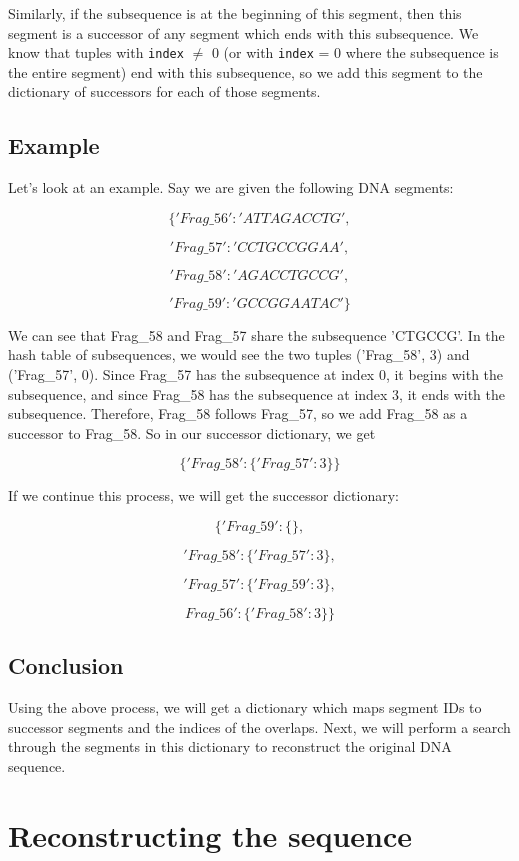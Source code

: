 \documentclass{article}
\begin{document}
Similarly, if the subsequence is at the beginning of this segment, then this segment is a successor of any segment which ends with this subsequence. We know that tuples with \texttt{index} $\neq$ 0 (or with \texttt{index} = 0 where the subsequence is the entire segment) end with this subsequence, so we add this segment to the dictionary of successors for each of those segments.

\subsection{Example}

Let's look at an example. Say we are given the following DNA segments:

$$\{'Frag\_56': 'ATTAGACCTG',$$

$$'Frag\_57': 'CCTGCCGGAA',$$

$$'Frag\_58': 'AGACCTGCCG',$$

$$'Frag\_59': 'GCCGGAATAC'\}$$

We can see that Frag\_58 and Frag\_57 share the subsequence 'CTGCCG'. In the hash table of subsequences, we would see the two tuples ('Frag\_58', 3) and ('Frag\_57', 0). Since Frag\_57 has the subsequence at index 0, it begins with the subsequence, and since Frag\_58 has the subsequence at index 3, it ends with the subsequence. Therefore, Frag\_58 follows Frag\_57, so we add Frag\_58 as a successor to Frag\_58. So in our successor dictionary, we get

$$\{'Frag\_58': \{'Frag\_57': 3\}\}$$

If we continue this process, we will get the successor dictionary:

$$\{'Frag\_59': \{\},$$

$$'Frag\_58': \{'Frag\_57': 3\},$$

$$'Frag\_57': \{'Frag\_59': 3\},$$

$$Frag\_56': \{'Frag\_58': 3\}\}$$

\subsection{Conclusion}

Using the above process, we will get a dictionary which maps segment IDs to successor segments and the indices of the overlaps. Next, we will perform a search through the segments in this dictionary to reconstruct the original DNA sequence.

\section{Reconstructing the sequence}
\end{document}
